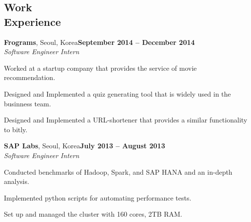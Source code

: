 \documentclass[11pt,margin,line]{cv}
\begin{document}
\begin{resume}
    \section{\mysidestyle Work\\Experience}
    \textbf{Frograms}, Seoul, Korea\hfill \textbf{September 2014 -- December 2014} \vspace{1mm}\\\vspace{0mm}%
    \textsl{Software Engineer Intern}
    \vspace{-2mm}\\\vspace{-1mm}%
    \begin{list3}
        \item Worked at a startup company that provides the service of movie recommendation.
        \item Designed and Implemented a quiz generating tool that is widely used in the businness team.
        \item Designed and Implemented a URL-shortener that provides a similar functionality to bitly.
    \end{list3}

    \textbf{SAP Labs}, Seoul, Korea\hfill \textbf{July 2013 -- August 2013} \vspace{1mm}\\\vspace{0mm}%
    \textsl{Software Engineer Intern}
    \vspace{-2mm}\\\vspace{-1mm}%
    \begin{list3}
        \item Conducted benchmarks of Hadoop, Spark, and SAP HANA and an in-depth analysis.
        \item Implemented python scripts for automating performance tests.
        \item Set up and managed the cluster with 160 cores, 2TB RAM.
    \end{list3}



\end{resume}
\end{document}
